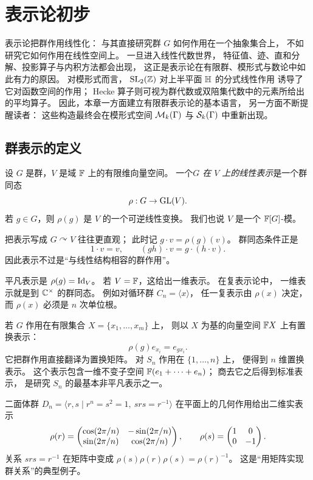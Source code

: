 \chapter{表示论初步}
表示论把群作用线性化： 与其直接研究群 $G$ 如何作用在一个抽象集合上， 不如研究它如何作用在线性空间上。 一旦进入线性代数世界， 特征值、迹、直和分解、投影算子与内积方法都会出现， 这正是表示论在有限群、模形式与数论中如此有力的原因。 对模形式而言， $\mathrm{SL}_2(\mathbb{Z})$ 对上半平面 $\mathbb{H}$ 的分式线性作用 诱导了它对函数空间的作用； Hecke 算子则可视为群代数或双陪集代数中的元素所给出的平均算子。 因此，本章一方面建立有限群表示论的基本语言， 另一方面不断提醒读者： 这些构造最终会在模形式空间 $\mathcal{M}_k(\Gamma)$ 与 $\mathcal{S}_k(\Gamma)$ 中重新出现。
\section{群表示的定义}
\begin{definition}
设 $G$ 是群，$V$ 是域 $\mathbb{F}$ 上的有限维向量空间。 一个\emph{$G$ 在 $V$ 上的线性表示}是一个群同态
\[
\rho:G\to \mathrm{GL}(V).
\]
若 $g\in G$，则 $\rho(g)$ 是 $V$ 的一个可逆线性变换。 我们也说 $V$ 是一个 $\mathbb{F}[G]$-模。
\end{definition}
把表示写成 $G\curvearrowright V$ 往往更直观； 此时记 $g\cdot v=\rho(g)(v)$。 群同态条件正是
\[
1\cdot v=v,\qquad (gh)\cdot v=g\cdot(h\cdot v).
\]
因此表示不过是“与线性结构相容的群作用”。
\begin{example}
平凡表示是 $\rho(g)=\mathrm{Id}_V$。 若 $V=\mathbb{F}$，这给出一维表示。 在复表示论中， 一维表示就是到 $\mathbb{C}^\times$ 的群同态。 例如对循环群 $C_n=\langle x\rangle$， 任一复表示由 $\rho(x)$ 决定， 而 $\rho(x)$ 必须是 $n$ 次单位根。
\end{example}
\begin{example}
若 $G$ 作用在有限集合 $X=\{x_1,\dots,x_m\}$ 上， 则以 $X$ 为基的向量空间 $\mathbb{F} X$ 上有置换表示：
\[
\rho(g)e_{x_i}=e_{g x_i}.
\]
它把群作用直接翻译为置换矩阵。 对 $S_n$ 作用在 $\{1,\dots,n\}$ 上， 便得到 $n$ 维置换表示。 这个表示包含一维不变子空间 $\mathbb{F}(e_1+\cdots+e_n)$； 商去它之后得到标准表示， 是研究 $S_n$ 的最基本非平凡表示之一。
\end{example}
\begin{example}
二面体群 $D_n=\langle r,s\mid r^n=s^2=1,\ srs=r^{-1}\rangle$ 在平面上的几何作用给出二维实表示
\[
\rho(r)=
\begin{pmatrix} \cos(2\pi/n)&-\sin(2\pi/n)\\ \sin(2\pi/n)&\cos(2\pi/n) \end{pmatrix},
\qquad
\rho(s)=\begin{pmatrix} 1&0\\0&-1 \end{pmatrix}.
\]
关系 $srs=r^{-1}$ 在矩阵中变成 $\rho(s)\rho(r)\rho(s)=\rho(r)^{-1}$。 这是“用矩阵实现群关系”的典型例子。
\end{example}
